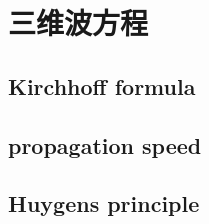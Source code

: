 \section{三维波方程}
\label{b2:sec:1102}


\subsection{Kirchhoff formula}
\label{b2:subsec:110201}

\subsection{propagation speed}
\label{b2:subsec:110202}

\subsection{Huygens principle}
\label{b2:subsec:110203}


